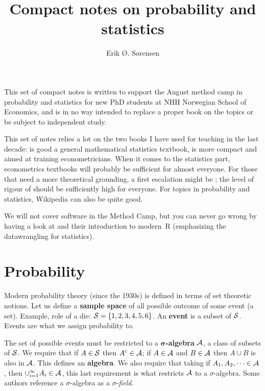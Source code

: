 \documentclass[twoside]{article}
\title{Compact notes on probability and statistics}
\author{Erik Ø. Sørensen}
\begin{document}
\maketitle
\sloppy
\frenchspacing



\tableofcontents
\thispagestyle{empty}
\newpage
\noindent This set of compact notes is written to support the August method camp
in probability and statistics for new PhD students at NHH Norwegian School of
Economics, and is in no way intended to replace a proper book on the topics or
be subject to independent study.

This set of notes relies a lot on the two books
I have used for teaching in the last decade: \citet{Hogg2013} is good a general 
mathematical statistics textbook, 
\citet{Linton2017} is more compact and aimed at training econometricians. When it comes to the statistics part, econometrics textbooks
will probably be sufficient for almost everyone. For those that need a more
theoretical grounding, a first escalation might be \citet{Rosenthal2006}; the
level of rigour of \citet{Billingsley1995} should be sufficiently high for
everyone. For topics in probability and statistics, Wikipedia can also be quite good.

We will not cover software in the Method Camp, but you can never go wrong by
having a look at \citet{Wickham2017} and their introduction to modern~R (emphasizing
the datawrangling for statistics).


\section{Probability}
Modern probability theory (since the 1930s) is defined in terms of set theoretic
notions. 
Let us define a \textbf{sample space} of all possible outcome of some
event (a set). Example, role of a die: $\mathcal{S} =\{1,2,3,4,5,6\}$. 
An \textbf{event} is a subset of $\mathcal{S}$. Events are what we assign probability
to.

The set of possible events must be restricted to a
$\mathbf{\sigma}$\textbf{-algebra} $\mathcal{A}$, a class of subsets of $\mathcal{S}$. We
require that if $A\in\mathcal{S}$ then $A^c\in\mathcal{A}$; if $A\in\mathcal{A}$ and $B\in\mathcal{A}$
then $A\cup B$ is also in $\mathcal{A}$. This defines an \textbf{algebra}. We also
require that taking  if $A_1,A_2,\dots\in \mathcal{A}$, then $\cup_{i=1}^\infty A_i
\in \mathcal{A}$, this last requirement is what restricts $\mathcal{A}$ to a
$\sigma$-algebra. Some authors reference a $\sigma$-algebra as a $\sigma$-\emph{field}.
\end{document}
